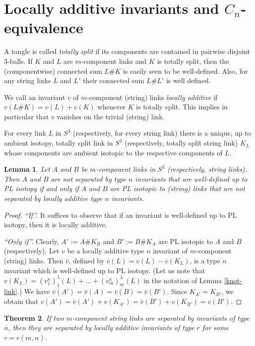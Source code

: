 \documentclass[a4paper,12pt,reqno,oneside]{amsart} %
\theoremstyle{plain}
\newtheorem{theorem}{Theorem}[section]
\newtheorem{lemma}[theorem]{Lemma}
\theoremstyle{definition}
\theoremstyle{named}
\renewcommand{\:}{\colon}
\begin{document}
\section{Locally additive invariants and $C_n$-equivalence} \label{cn-equivalence}

A tangle is called {\it totally split} if its components are contained in pairwise disjoint $3$-balls.
If $K$ and $L$ are $m$-component links and $K$ is totally split, then the (componentwise) connected sum
$L\#K$ is easily seen to be well-defined.
Also, for any string links $L$ and $L'$ their connected sum $L\# L'$ is well defined.

We call an invariant $v$ of $m$-component (string) links {\it locally additive} if $v(L\# K)=v(L)+v(K)$ 
whenever $K$ is totally split.
This implies in particular that $v$ vanishes on the trivial (string) link.

For every link $L$ in $S^3$ (respectively, for every string link) there is a unique, 
up to ambient isotopy, totally split link in $S^3$ (respectively, totally split string link) $K_L$ whose 
components are ambient isotopic to the respective components of $L$.

\begin{lemma} \label{LA-lemma0}
Let $A$ and $B$ be $m$-component links in $S^3$ (respectively, string links).
Then $A$ and $B$ are not separated by type $n$ invariants that are well-defined up to PL isotopy
if and only if $A$ and $B$ are PL isotopic to (string) links that are not separated by locally additive type $n$ invariants.
\end{lemma}

\begin{proof} {\it ``If''.} It suffices to observe that if an invariant is well-defined up to PL isotopy, then it is locally additive.

{\it ``Only if''.} Clearly, $A':=A\#K_B$ and $B':=B\#K_A$ are PL isotopic to $A$ and $B$ (respectively).
Let $v$ be a locally additive type $n$ invariant of $m$-component (string) links.
Then $\bar v$, defined by $\bar v(L)=v(L)-v(K_L)$, is a type $n$ invariant which is well-defined up to PL isotopy.
(Let us note that $v(K_L)=(v^\kappa_1)^\lambda_1(L)+\dots+(v^\kappa_m)^\lambda_m(L)$ in the notation of Lemma \ref{knot-link}.)
We have $\bar v(A')=\bar v(A)=\bar v(B)=\bar v(B')$.
Since $K_{A'}=K_{B'}$, we obtain that $v(A')=\bar v(A')+v(K_{A'})=\bar v(B')+v(K_{B'})=v(B')$.
\end{proof}

\begin{theorem} \label{locally-additive2}
If two $m$-component string links are separated by invariants of type $n$, then they are separated by locally additive 
invariants of type $r$ for some $r=r(m,n)$.
\end{theorem}
\end{document}
